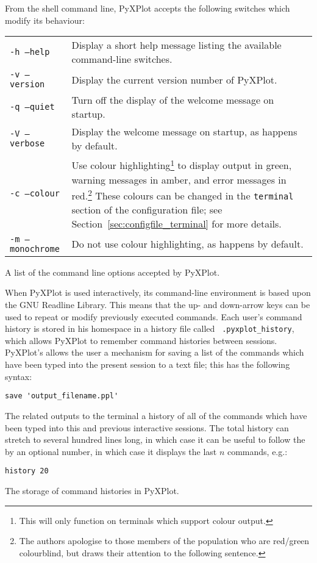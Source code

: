 \begin{boxout}
From the shell command line, PyXPlot accepts the following switches which
modify its behaviour:
\vspace{0.5cm}

\begin{tabular}{p{3.0cm}p{8.3cm}}
{\tt -h --help} & Display a short help message listing the available command-line switches.\\
{\tt -v --version} & Display the current version number of PyXPlot.\\
{\tt -q --quiet} & Turn off the display of the welcome message on startup. \\
{\tt -V --verbose} & Display the welcome message on startup, as happens by default. \\
{\tt -c --colour} & Use colour highlighting\footnote{This will only function on terminals which support colour output.} to display output in green, warning messages in amber, and error messages in red.\footnote{The authors apologise to those members of the population who are red/green colourblind, but draws their attention to the following sentence.} These colours can be changed in the {\tt terminal} section of the configuration file; see Section~\ref{sec:configfile_terminal} for more details. \\
{\tt -m --monochrome} & Do not use colour highlighting, as happens by default. \\
\end{tabular}
\caption{A list of the command line options accepted by PyXPlot.}
\label{box:command_switches}
\end{boxout}

\begin{boxout}
When PyXPlot is used interactively, its command-line environment is based upon
the GNU Readline Library. This means that the up- and down-arrow keys can be
used to repeat or modify previously executed commands. Each user's command
history is stored in his homespace in a history file called {\tt
.pyxplot\_history}, which allows PyXPlot to remember command histories between
sessions. PyXPlot's  allows the user a mechanism for saving a
list of the commands which have been typed into the present session to a text
file; this has the following syntax:

\begin{verbatim}
save 'output_filename.ppl'
\end{verbatim}

The related  outputs to the terminal a history of all of the
commands which have been typed into this and previous interactive sessions. The
total history can stretch to several hundred lines long, in which case it can
be useful to follow the  by an optional number, in which case
it displays the last $n$ commands, e.g.:

\begin{verbatim}
history 20
\end{verbatim}
\caption{The storage of command histories in PyXPlot.}
\label{box:command_history}
\end{boxout}

